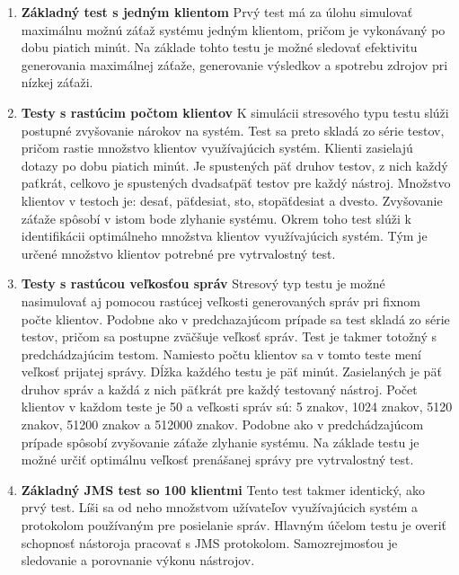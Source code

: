 \documentclass[12pt,oneside,final]{fithesis-utf8}
\begin{document}
\begin{enumerate}

\item \textbf{Základný test s jedným klientom}
\newline
Prvý test má za úlohu simulovať maximálnu možnú záťaž systému jedným klientom, pričom je vykonávaný po dobu piatich minút. Na základe tohto testu je možné sledovať efektivitu generovania maximálnej záťaže, generovanie výsledkov a spotrebu zdrojov pri nízkej záťaži.
\newline

\item \textbf{Testy s rastúcim počtom klientov}
\newline
K simulácii stresového typu testu slúži postupné zvyšovanie nárokov na systém. Test sa preto skladá zo série testov, pričom rastie množstvo klientov využívajúcich systém. Klienti zasielajú dotazy po dobu piatich minút. Je spustených päť druhov testov, z nich každý paťkrát, celkovo je spustených dvadsaťpäť testov pre každý nástroj. Množstvo klientov v testoch je: desať, päťdesiat, sto, stopäťdesiat a dvesto. Zvyšovanie záťaže spôsobí v istom bode zlyhanie systému. Okrem toho test slúži k identifikácii optimálneho množstva klientov využívajúcich systém. Tým je určené množstvo klientov potrebné pre vytrvalostný test.
\newline

\item \textbf{Testy s rastúcou veľkosťou správ}
\newline
Stresový typ testu je možné nasimulovať aj pomocou rastúcej veľkosti generovaných správ pri fixnom počte klientov. Podobne ako v predchazajúcom prípade sa test skladá zo série testov, pričom sa postupne zväčšuje veľkosť správ. Test je takmer totožný s predchádzajúcim testom. Namiesto počtu klientov sa v tomto teste mení veľkosť prijatej správy. Dĺžka každého testu je päť minút. Zasielaných je päť druhov správ a každá z nich päťkrát pre každý testovaný nástroj. Počet klientov v každom teste je 50 a veľkosti  správ sú: 5 znakov, 1024 znakov, 5120 znakov, 51200 znakov a 512000 znakov. Podobne ako v predchádzajúcom prípade spôsobí zvyšovanie záťaže zlyhanie systému. Na základe testu je možné určiť optimálnu veľkosť prenášanej správy pre vytrvalostný test.
\newline

\newpage
\item \textbf{Základný JMS test so 100 klientmi}
\newline
Tento test takmer identický, ako prvý test. Líši sa od neho množstvom užívateľov využívajúcich systém a protokolom používaným pre posielanie správ. Hlavným účelom testu je overiť schopnosť nástoroja pracovať s JMS protokolom. Samozrejmosťou je sledovanie a porovnanie výkonu nástrojov.
\newline


\end{enumerate}
\end{document}

